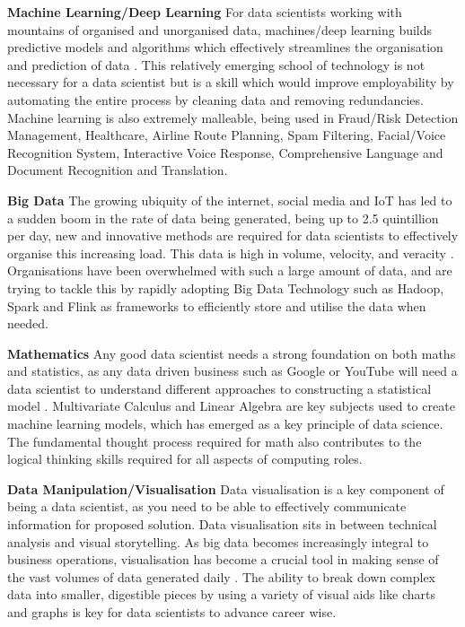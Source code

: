 \documentclass[a4paper, 11pt]{report}
\begin{document}
\textbf{Machine Learning/Deep Learning}
For data scientists working with mountains of organised and unorganised data, machines/deep learning builds predictive models and algorithms which effectively streamlines the organisation and prediction of data \cite{ali1}. This relatively emerging school of technology is not necessary for a data scientist but is a skill which would improve employability by automating the entire process by cleaning data and removing redundancies. Machine learning is also extremely malleable, being used in Fraud/Risk Detection Management, Healthcare, Airline Route Planning, Spam Filtering, Facial/Voice Recognition System, Interactive Voice Response, Comprehensive Language and Document Recognition and Translation.

\textbf{Big Data}
The growing ubiquity of the internet, social media and IoT has led to a sudden boom in the rate of data being generated, being up to 2.5 quintillion per day, new and innovative methods are required for data scientists to effectively organise this increasing load. This data is high in volume, velocity, and veracity \cite{ali2}. Organisations have been overwhelmed with such a large amount of data, and are trying to tackle this by rapidly adopting Big Data Technology such as Hadoop, Spark and Flink as frameworks to efficiently store and utilise the data when needed.

\textbf{Mathematics}
Any good data scientist needs a strong foundation on both maths and statistics, as any data driven business such as Google or YouTube will need a data scientist to understand different approaches to constructing a statistical model \cite{ali4}.  Multivariate Calculus and Linear Algebra are key subjects used to create machine learning models, which has emerged as a key principle of data science. The fundamental thought process required for math also contributes to the logical thinking skills required for all aspects of computing roles.

\textbf{Data Manipulation/Visualisation}
Data visualisation is a key component of being a data scientist, as you need to be able to effectively communicate information for proposed solution.  Data visualisation sits in between technical analysis and visual storytelling. As big data becomes increasingly integral to business operations, visualisation has become a crucial tool in making sense of the vast volumes of data generated daily \cite{ali4}. The ability to break down complex data into smaller, digestible pieces by using a variety of visual aids like charts and graphs is key for data scientists to advance career wise.
\end{document}
